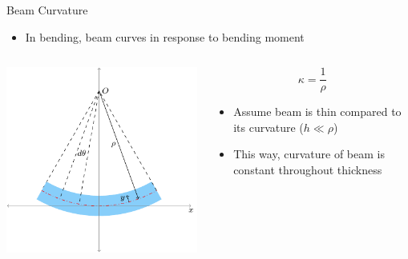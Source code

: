 \documentclass[10pt, svgnames]{beamer}
\begin{document}
\begin{frame}[label={sec:org65b9c93}]{Beam Curvature}
\begin{itemize}
\item In bending, beam curves in response to bending moment
\end{itemize}

\begin{columns}
\begin{column}{0.6\columnwidth}
\begin{center}
\includegraphics[width=.9\linewidth]{pictures/beam-curvature.pdf}
\end{center}
\end{column}

\begin{column}{0.4\columnwidth}
\[\kappa = \frac{1}{\rho}\]

\begin{itemize}
\item Assume beam is thin compared to its curvature (\(h \ll \rho\))

\item This way, curvature of beam is constant throughout thickness
\end{itemize}
\end{column}
\end{columns}
\end{frame}
\end{document}
